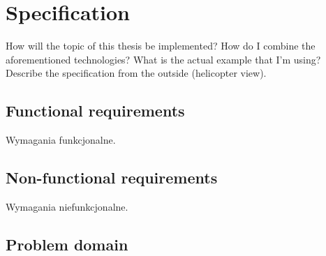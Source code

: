 \chapter{Specification}
\label{ch:specification}
How will the topic of this thesis be implemented? How do I combine the aforementioned technologies? What is the actual example that I'm using? Describe the specification from the outside (helicopter view).


\section{Functional requirements}
Wymagania funkcjonalne.


\section{Non-functional requirements}
Wymagania niefunkcjonalne.


\section{Problem domain}

